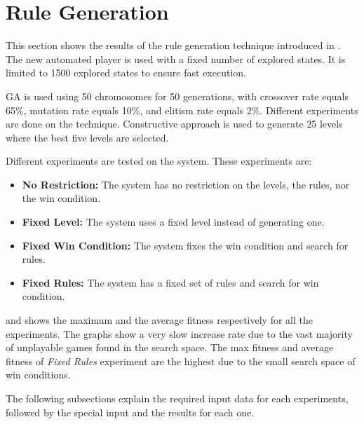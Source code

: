 \section{Rule Generation}
This section shows the results of the rule generation technique introduced in . The new automated player is used with a fixed number of explored states. It is limited to 1500 explored states to ensure fast execution.\\\par

GA is used using 50 chromosomes for 50 generations, with crossover rate equals 65\%, mutation rate equals 10\%, and elitism rate equals 2\%. Different experiments are done on the technique. Constructive approach is used to generate 25 levels where the best five levels are selected.\\\par

Different experiments are tested on the system. These experiments are:
\begin{itemize}
	\item \textbf{No Restriction:} The system has no restriction on the levels, the rules, nor the win condition.
	\item \textbf{Fixed Level:} The system uses a fixed level instead of generating one.
	\item \textbf{Fixed Win Condition:} The system fixes the win condition and search for rules.
	\item \textbf{Fixed Rules:} The system has a fixed set of rules and search for win condition. 
\end{itemize}

 and  shows the maximum and the average fitness respectively for all the experiments. The graphs show a very slow increase rate due to the vast majority of unplayable games found in the search space. The max fitness and average fitness of \emph{Fixed Rules} experiment are the highest due to the small search space of win conditions.



The following subsections explain the required input data for each experiments, followed by the special input and the results for each one.

